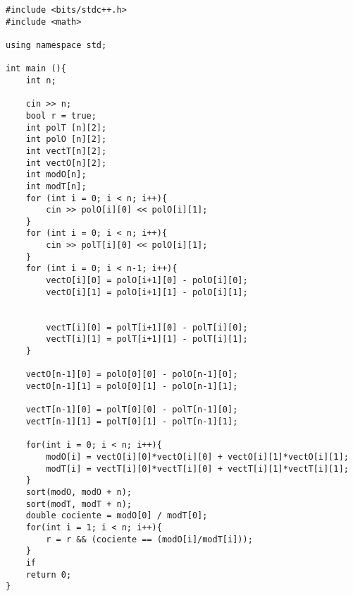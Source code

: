 \begin{verbatim}
#include <bits/stdc++.h>
#include <math>

using namespace std;

int main (){
	int n;

	cin >> n;
	bool r = true;
	int polT [n][2];
	int polO [n][2];
	int vectT[n][2];
	int vectO[n][2];
	int modO[n];
	int modT[n];
	for (int i = 0; i < n; i++){
		cin >> polO[i][0] << polO[i][1];
	}
	for (int i = 0; i < n; i++){
		cin >> polT[i][0] << polO[i][1];
	}
	for (int i = 0; i < n-1; i++){
		vectO[i][0] = polO[i+1][0] - polO[i][0];
		vectO[i][1] = polO[i+1][1] - polO[i][1];


		vectT[i][0] = polT[i+1][0] - polT[i][0];
		vectT[i][1] = polT[i+1][1] - polT[i][1];
	}

	vectO[n-1][0] = polO[0][0] - polO[n-1][0];
	vectO[n-1][1] = polO[0][1] - polO[n-1][1];

	vectT[n-1][0] = polT[0][0] - polT[n-1][0];
	vectT[n-1][1] = polT[0][1] - polT[n-1][1];

	for(int i = 0; i < n; i++){
		modO[i] = vectO[i][0]*vectO[i][0] +	vectO[i][1]*vectO[i][1];
		modT[i] = vectT[i][0]*vectT[i][0] +	vectT[i][1]*vectT[i][1];
	}
	sort(modO, modO + n);
	sort(modT, modT + n);
	double cociente = modO[0] / modT[0];
	for(int i = 1; i < n; i++){
		r = r && (cociente == (modO[i]/modT[i]));
	}
	if
	return 0;
}

\end{verbatim}

